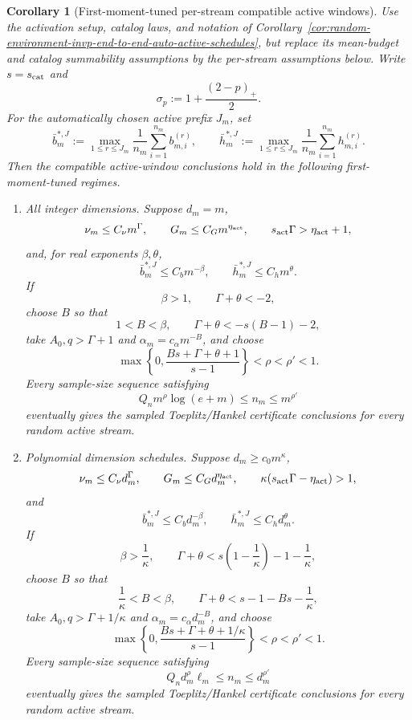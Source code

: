\documentclass[11pt]{amsart}
\numberwithin{equation}{section}
\newtheorem{corollary}[theorem]{Corollary}
\theoremstyle{definition}
\theoremstyle{remark}
\begin{document}
\begin{corollary}[First-moment-tuned per-stream compatible active windows]
\label{cor:random-environment-invp-end-to-end-auto-active-mean-tuned-windows}
Use the activation setup, catalog laws, and notation of
Corollary~\ref{cor:random-environment-invp-end-to-end-auto-active-schedules},
but replace its mean-budget and catalog summability assumptions by the
per-stream assumptions below.  Write \(s=s_{\rm cat}\) and
\[
  \sigma_p:=1+\frac{(2-p)_+}{2}.
\]
For the automatically chosen active prefix \(J_m\), set
\[
  \bar b_m^{*,J}:=
  \max_{1\le r\le J_m}\frac1{n_m}\sum_{i=1}^{n_m}b_{m,i}^{(r)},
  \qquad
  \bar h_m^{*,J}:=
  \max_{1\le r\le J_m}\frac1{n_m}\sum_{i=1}^{n_m}h_{m,i}^{(r)} .
\]
Then the compatible active-window conclusions hold in the following
first-moment-tuned regimes.

\begin{enumerate}[label=\textup{(\roman*)},leftmargin=2.2em]
\item All integer dimensions.  Suppose \(d_m=m\),
\[
  \nu_m\le C_\nu m^\Gamma,\qquad
  G_m\le C_G m^{\eta_{\rm act}},\qquad
  s_{\rm act}\Gamma>\eta_{\rm act}+1,
\]
and, for real exponents \(\beta,\theta\),
\[
  \bar b_m^{*,J}\le C_b m^{-\beta},\qquad
  \bar h_m^{*,J}\le C_h m^\theta .
\]
If
\[
  \beta>1,\qquad \Gamma+\theta<-2,
\]
choose \(B\) so that
\[
  1<B<\beta,\qquad \Gamma+\theta<-s(B-1)-2,
\]
take \(A_0,q>\Gamma+1\) and \(\alpha_m=c_\alpha m^{-B}\), and choose
\[
  \max\left\{0,\frac{Bs+\Gamma+\theta+1}{s-1}\right\}<\rho<\rho'<1 .
\]
Every sample-size sequence satisfying
\[
  Q_n m^\rho\log(e+m)\le n_m\le m^{\rho'}
\]
eventually gives the sampled Toeplitz/Hankel certificate conclusions for every
random active stream.

\item Polynomial dimension schedules.  Suppose \(d_m\ge c_0m^\kappa\),
\[
  \nu_m\le C_\nu d_m^\Gamma,\qquad
  G_m\le C_G d_m^{\eta_{\rm act}},\qquad
  \kappa(s_{\rm act}\Gamma-\eta_{\rm act})>1,
\]
and
\[
  \bar b_m^{*,J}\le C_b d_m^{-\beta},\qquad
  \bar h_m^{*,J}\le C_h d_m^\theta .
\]
If
\[
  \beta>\frac1\kappa,\qquad
  \Gamma+\theta<s\left(1-\frac1\kappa\right)-1-\frac1\kappa,
\]
choose \(B\) so that
\[
  \frac1\kappa<B<\beta,\qquad
  \Gamma+\theta<s-1-Bs-\frac1\kappa,
\]
take \(A_0,q>\Gamma+1/\kappa\) and \(\alpha_m=c_\alpha d_m^{-B}\), and choose
\[
  \max\left\{0,\frac{Bs+\Gamma+\theta+1/\kappa}{s-1}\right\}<\rho<\rho'<1 .
\]
Every sample-size sequence satisfying
\[
  Q_n d_m^\rho\ell_m\le n_m\le d_m^{\rho'}
\]
eventually gives the sampled Toeplitz/Hankel certificate conclusions for every
random active stream.


\end{enumerate}
\end{corollary}
\end{document}

